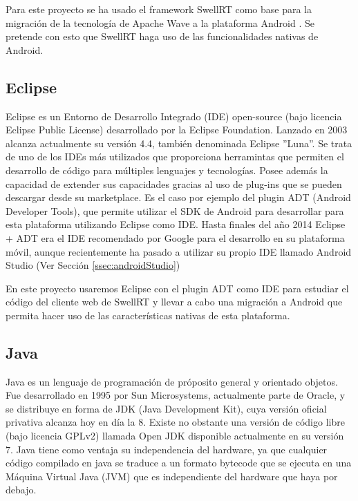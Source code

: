     Para este proyecto se ha usado el framework SwellRT como base para la migración de la tecnología de Apache Wave a la plataforma Android \cite{ref:android_platform}. Se pretende con esto que SwellRT haga uso de las funcionalidades nativas de Android.
    
    \subsection{Eclipse}\label{ssec:eclipse} 
    
	Eclipse \cite{ref:eclipse} es un Entorno de Desarrollo Integrado (IDE) open-source (bajo licencia Eclipse Public License) desarrollado por la Eclipse Foundation. Lanzado en 2003 alcanza actualmente su versión 4.4, también denominada Eclipse ''Luna''. Se trata de uno de los IDEs más utilizados que proporciona herramintas que permiten el desarrollo de código para múltiples lenguajes y tecnologías. Posee además la capacidad de extender sus capacidades gracias al uso de plug-ins que se pueden descargar desde su marketplace. Es el caso por ejemplo del plugin ADT (Android Developer Tools), que permite utilizar el SDK de Android para desarrollar para esta plataforma utilizando Eclipse como IDE. Hasta finales del año 2014 Eclipse + ADT era el IDE recomendado por Google para el desarrollo en su plataforma móvil, aunque recientemente ha pasado a utilizar su propio IDE llamado Android Studio (Ver Sección \ref{ssec:androidStudio})
	
	En este proyecto usaremos Eclipse con el plugin ADT como IDE para estudiar el código del cliente web de SwellRT y llevar a cabo una migración a Android que permita hacer uso de las características nativas de esta plataforma.
    
    \subsection{Java}\label{ssec:java}
    
	Java \cite{ref:java} es un lenguaje de programación de próposito general y orientado objetos. Fue desarrollado en 1995 por Sun Microsystems, actualmente parte de Oracle, y se distribuye en forma de JDK (Java Development Kit), cuya versión oficial privativa alcanza hoy en día la 8. Existe no obstante una versión de código libre (bajo licencia GPLv2) llamada Open JDK \cite{ref:openjdk} disponible actualmente en su versión 7. Java tiene como ventaja su independencia del hardware, ya que cualquier código compilado en java se traduce a un formato bytecode que se ejecuta en una Máquina Virtual Java (JVM) que es independiente del hardware que haya por debajo.
	
